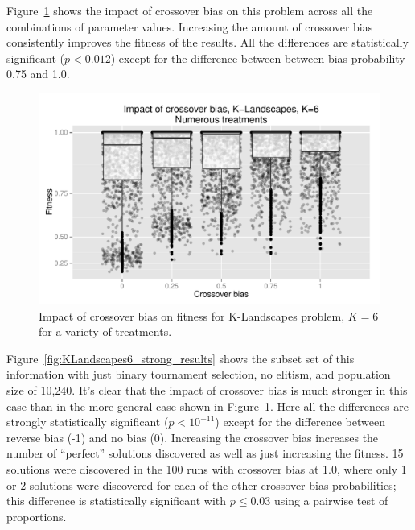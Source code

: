 \documentclass{sig-alternate}
\begin{document}
Figure~\ref{fig:KLandscapes6_results} shows the impact of crossover bias on this problem across all the 
combinations of parameter values. Increasing the amount of crossover bias consistently improves the 
fitness of the results. All the differences are statistically significant ($p < 0.012$) except for the difference between
between bias probability 0.75 and 1.0.

%
%
%
%

\begin{figure}
\centering
\includegraphics[width=0.45 \textwidth]{Plots/KLandscapes6_XO_bias_impact_transformed_boxplot_alpha075.pdf}
\caption{Impact of crossover bias on fitness for K-Landscapes problem, $K=6$ for a variety of treatments.}
\label{fig:KLandscapes6_results}
\end{figure}

Figure~\ref{fig:KLandscapes6_strong_results} shows the subset set of this information with just binary tournament 
selection, no elitism, and population size of 10,240. It's clear that the impact of crossover bias is much stronger in this 
case than in the more general case shown in Figure~\ref{fig:KLandscapes6_results}. Here all the differences are strongly 
statistically significant ($p < 10^{-11}$) except for the difference between reverse bias (-1) and no bias (0). Increasing 
the crossover bias increases the number of ``perfect'' solutions discovered as well as just increasing the fitness. 15 
solutions were discovered in the 100 runs with crossover bias at 1.0, where only 1 or 2 solutions were discovered for 
each of the other crossover bias probabilities; this difference is statistically significant with $p \leq 0.03$ using a 
pairwise test of proportions.
\end{document}

